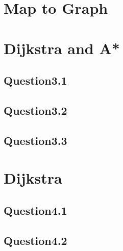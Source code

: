 \documentclass{article}
\begin{document}
    \section{Map to Graph}
    \newpage
    
    \section{Dijkstra and A*}
        \subsection{Question3.1}
        \subsection{Question3.2}
        \subsection{Question3.3}
    \newpage
    
    \section{Dijkstra}
        \subsection{Question4.1}
        \subsection{Question4.2}
    \newpage
\end{document}
